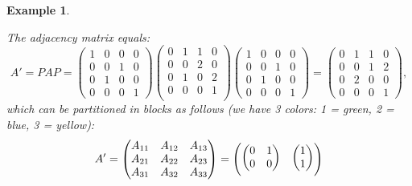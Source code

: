 \documentclass[a4paper,11pt]{report}
\newtheorem{example}[theorem]{Example}
\begin{document}
\begin{example}
\begin{center}
\end{center}

The adjacency matrix equals:
$$A' = PAP = \begin{pmatrix}
1 & 0 & 0 & 0\\
0 & 0 & 1 & 0\\
0 & 1 & 0 & 0\\
0 & 0 & 0 & 1
\end{pmatrix}\begin{pmatrix}
0 & 1 & 1  & 0\\
0 & 0 & 2 & 0\\
0 & 1 & 0 & 2\\
0 & 0 & 0 & 1\\
\end{pmatrix}\begin{pmatrix}
1 & 0 & 0 & 0\\
0 & 0 & 1 & 0\\
0 & 1 & 0 & 0\\
0 & 0 & 0 & 1
\end{pmatrix}=
\begin{pmatrix}
0 & 1 & 1 & 0\\
0 & 0 & 1 & 2\\
0 & 2 & 0 & 0\\
0 & 0 & 0 & 1
\end{pmatrix},$$
which can be partitioned in blocks as follows (we have 3 colors: 1 = green, 2 = blue, 3 = yellow):
$$A' = \begin{pmatrix}
A_{11} & A_{12} & A_{13}\\
A_{21} & A_{22} & A_{23}\\
A_{31} & A_{32} & A_{33}\\
\end{pmatrix} =
\begin{pmatrix}\smallskip
\begin{pmatrix}
 0 & 1\\
 0 & 0\\
\end{pmatrix}& 
\begin{pmatrix}
 1\\
 1\\
\end{pmatrix}

\end{pmatrix}$$
\end{example}
\end{document}
